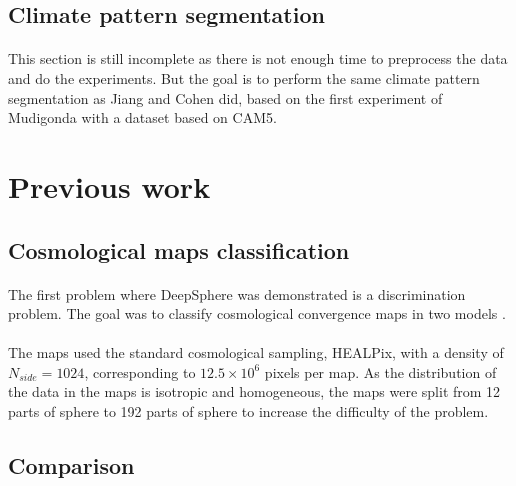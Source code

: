 \documentclass[11pt]{report}
\begin{document}
\subsection{Climate pattern segmentation}
\paragraph*{}
This section is still incomplete as there is not enough time to preprocess the data and do the experiments. But the goal is to perform the same climate pattern segmentation as Jiang and Cohen did, based on the first experiment of Mudigonda \cite{mudigonda_segmenting_nodate,jiang_spherical_2019,cohen_gauge_2019} with a dataset based on CAM5.


\section{Previous work}\label{task:cosmo}
\subsection{Cosmological maps classification}
\paragraph*{}
The first problem where DeepSphere was demonstrated is a discrimination problem. The goal was to classify cosmological convergence maps in two models \cite{perraudin_deepsphere:_2018}.

\paragraph*{}
The maps used the standard cosmological sampling, HEALPix, with a density of\linebreak $N_{side}=1024$, corresponding to $12.5\times 10^6$ pixels per map. As the distribution of the data in the maps is isotropic and homogeneous, the maps were split from 12 parts of sphere to 192 parts of sphere to increase the difficulty of the problem.


\subsection{Comparison}
\end{document}
